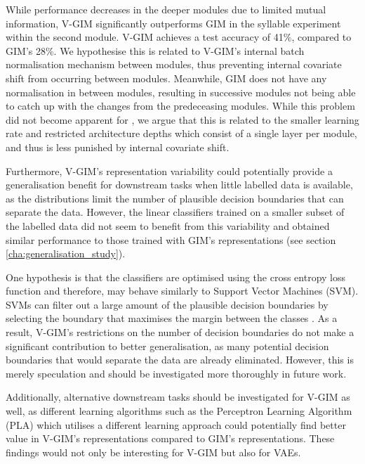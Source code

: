		While performance decreases in the deeper modules due to limited mutual information, V-GIM significantly outperforms GIM in the syllable experiment within the second module. V-GIM achieves a test accuracy of 41\%, compared to GIM's 28\%. We hypothesise this is related to V-GIM's internal batch normalisation mechanism between modules, thus preventing internal covariate shift from occurring between modules. Meanwhile, GIM does not have any normalisation in between modules, resulting in successive modules not being able to catch up with the changes from the predeceasing modules. While this problem did not become apparent for \citeauthor{lowePuttingEndEndtoEnd2020}, we argue that this is related to the smaller learning rate and restricted architecture depths which consist of a single layer per module, and thus is less punished by internal covariate shift.
				
		Furthermore, V-GIM's representation variability could potentially provide a generalisation benefit for downstream tasks when little labelled data is available, as the distributions limit the number of plausible decision boundaries that can separate the data. However, the linear classifiers trained on a smaller subset of the labelled data did not seem to benefit from this variability and obtained similar performance to those trained with GIM's representations (see section \ref{cha:generalisation_study}). 
		
		One hypothesis is that the classifiers are optimised using the cross entropy loss function and therefore, may behave similarly to Support Vector Machines (SVM). SVMs can filter out a large amount of the plausible decision boundaries by selecting the boundary that maximises the margin between the classes \citep{hearstSupportVectorMachines1998, nobleWhatSupportVector2006}. As a result, V-GIM's restrictions on the number of decision boundaries do not make a significant contribution to better generalisation, as many potential decision boundaries that would separate the data are already eliminated.
		However, this is merely speculation and should be investigated more thoroughly in future work. 
		
		Additionally, alternative downstream tasks should be investigated for V-GIM as well, as different learning algorithms such as the Perceptron Learning Algorithm (PLA) which utilises a different learning approach could potentially find better value in V-GIM's representations compared to GIM's representations. These findings would not only be interesting for V-GIM but also for VAEs.
		
